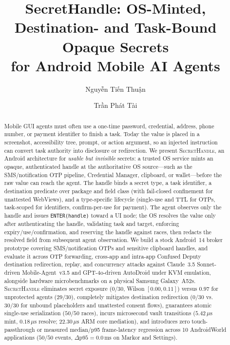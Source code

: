 \documentclass[sigconf,10pt]{acmart}
\newcommand{\SH}{\textsc{SecretHandle}}
\theoremstyle{acmplain}%
\begin{document}
\title[SecretHandle]{SecretHandle: OS-Minted, Destination- and Task-Bound Opaque Secrets\\ for Android Mobile AI Agents}

\author{Nguyễn Tiến Thuận}

\author{Trần Phát Tài}

\renewcommand{\shortauthors}{Nguyễn and Trần}

\begin{abstract}
Mobile GUI agents must often use a one-time password, credential, address, phone number, or payment identifier to finish a task. Today the value is placed in a screenshot, accessibility tree, prompt, or action argument, so an injected instruction can convert task authority into disclosure or redirection. We present \SH, an Android architecture for \emph{usable but invisible} secrets: a trusted OS service mints an opaque, authenticated handle at the authoritative OS source---such as the SMS/notification OTP pipeline, Credential Manager, clipboard, or wallet---before the raw value can reach the agent. The handle binds a secret type, a task identifier, a destination predicate over package and field class (with fail-closed confinement for unattested WebViews), and a type-specific lifecycle (single-use and TTL for OTPs, task-scoped for identifiers, confirm-per-use for payment). The agent observes only the handle and issues \texttt{ENTER(handle)} toward a UI node; the OS resolves the value only after authenticating the handle, validating task and target, enforcing expiry/use/confirmation, and reserving the handle against races, then redacts the resolved field from subsequent agent observation. We build a stock Android~14 broker prototype covering SMS/notification OTPs and sensitive clipboard handles, and evaluate it across OTP forwarding, cross-app and intra-app Confused Deputy destination redirection, replay, and concurrency attacks against Claude~3.5 Sonnet-driven Mobile-Agent~v3.5 and GPT-4o-driven AutoDroid under KVM emulation, alongside hardware microbenchmarks on a physical Samsung Galaxy~A52s. \SH{} eliminates secret exposure ($0/30$, Wilson $[0.00, 0.11]$) versus $0.97$ for unprotected agents ($29/30$), completely mitigates destination redirection ($0/30$ vs.\ $30/30$ for unbound placeholders and unattested consent flows), guarantees atomic single-use serialization ($50/50$ races), incurs microsecond vault transitions ($5.42\,\mu\text{s}$ mint, $0.18\,\mu\text{s}$ resolve; $22.30\,\mu\text{s}$ ARM core mediation), and introduces zero touch-passthrough or measured median/p95 frame-latency regression across 10 AndroidWorld applications ($50/50$ events, $\Delta\text{p95}=0.0\,\text{ms}$ on Markor and Settings).
\end{abstract}
\end{document}
